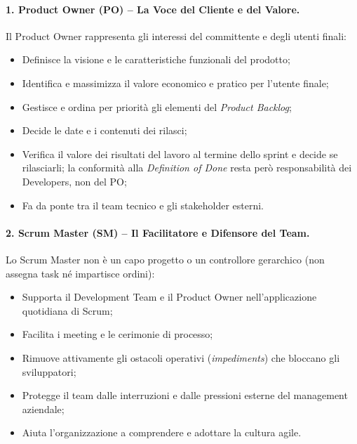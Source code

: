\documentclass[12pt]{extarticle}
\begin{document}
\paragraph{1. Product Owner (PO) -- La Voce del Cliente e del Valore.}
Il Product Owner rappresenta gli interessi del committente e degli utenti finali:
\begin{itemize}
    \item Definisce la visione e le caratteristiche funzionali del prodotto;
    \item Identifica e massimizza il valore economico e pratico per l'utente finale;
    \item Gestisce e ordina per priorità gli elementi del \textit{Product Backlog};
    \item Decide le date e i contenuti dei rilasci;
    \item Verifica il valore dei risultati del lavoro al termine dello sprint e decide se rilasciarli; la conformità alla \textit{Definition of Done} resta però responsabilità dei Developers, non del PO;
    \item Fa da ponte tra il team tecnico e gli stakeholder esterni.
\end{itemize}

\paragraph{2. Scrum Master (SM) -- Il Facilitatore e Difensore del Team.}
Lo Scrum Master non è un capo progetto o un controllore gerarchico (non assegna task né impartisce ordini):
\begin{itemize}
    \item Supporta il Development Team e il Product Owner nell'applicazione quotidiana di Scrum;
    \item Facilita i meeting e le cerimonie di processo;
    \item Rimuove attivamente gli ostacoli operativi (\textit{impediments}) che bloccano gli sviluppatori;
    \item Protegge il team dalle interruzioni e dalle pressioni esterne del management aziendale;
    \item Aiuta l'organizzazione a comprendere e adottare la cultura agile.
\end{itemize}
\end{document}
